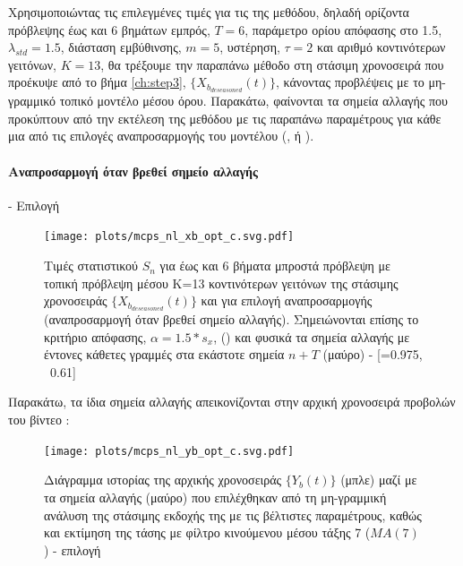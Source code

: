 Χρησιμοποιώντας τις επιλεγμένες τιμές για τις  της μεθόδου, δηλαδή ορίζοντα πρόβλεψης έως και 6 βημάτων εμπρός, $T=6$, παράμετρο ορίου απόφασης στο 1.5, $\lambda_{std}=1.5$, διάσταση εμβύθινσης, $m=5$, υστέρηση, $\tau=2$ και αριθμό κοντινότερων γειτόνων, $K=13$, θα τρέξουμε την παραπάνω μέθοδο στη στάσιμη χρονοσειρά που προέκυψε από το βήμα \ref{ch:step3}, $\{X_{b_{deseasoned}}(t)\}$, κάνοντας προβλέψεις με το μη-γραμμικό τοπικό μοντέλο μέσου όρου. Παρακάτω, φαίνονται τα σημεία αλλαγής που προκύπτουν από την εκτέλεση της μεθόδου με τις παραπάνω παραμέτρους για κάθε μια από τις επιλογές αναπροσαρμογής του μοντέλου (,  ή ).

\paragraph{Αναπροσαρμογή όταν βρεθεί σημείο αλλαγής}- Επιλογή 

\begin{figure}[H]
    \begin{center}
        \texttt{[image: plots/mcps\_nl\_xb\_opt\_c.svg.pdf]}
        \caption{Τιμές στατιστικού $S_n$ για έως και 6 βήματα μπροστά πρόβλεψη με τοπική πρόβλεψη μέσου Κ=13 κοντινότερων γειτόνων της στάσιμης χρονοσειράς $\{X_{b_{deseasoned}}(t)\}$ και για επιλογή αναπροσαρμογής  (αναπροσαρμογή όταν βρεθεί σημείο αλλαγής). Σημειώνονται επίσης το κριτήριο απόφασης, $\alpha=1.5*s_x$, () και φυσικά τα σημεία αλλαγής με έντονες κάθετες γραμμές στα εκάστοτε σημεία $n+T$ (μαύρο) - [=0.975, \ 0.61]}
        \label{fig:mcps_nl_xb_opt_c}
    \end{center}
\end{figure}

Παρακάτω, τα ίδια σημεία αλλαγής απεικονίζονται στην αρχική χρονοσειρά προβολών του βίντεο :

\begin{figure}[H]
    \begin{center}
        \texttt{[image: plots/mcps\_nl\_yb\_opt\_c.svg.pdf]}
        \caption{Διάγραμμα ιστορίας της αρχικής χρονοσειράς $\{Y_b(t)\}$ (μπλε) μαζί με τα σημεία αλλαγής (μαύρο) που επιλέχθηκαν από τη μη-γραμμική ανάλυση της στάσιμης εκδοχής της με τις βέλτιστες παραμέτρους, καθώς και εκτίμηση της τάσης με φίλτρο κινούμενου μέσου τάξης 7 ($MA(7)$ ) - επιλογή }
        \label{fig:mcps_nl_yb_opt_c}
    \end{center}
\end{figure}

